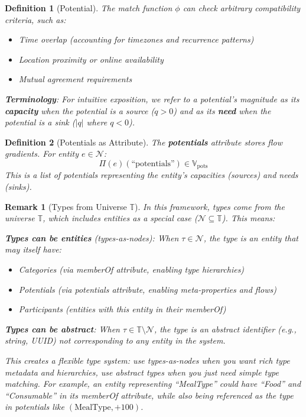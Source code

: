 \documentclass[11pt]{article}
\newtheorem{definition}{Definition}
\newtheorem{remark}{Remark}
\begin{document}
\begin{definition}[Potential]
The match function $\phi$ can check arbitrary compatibility criteria, such as:
\begin{itemize}
\item Time overlap (accounting for timezones and recurrence patterns)
\item Location proximity or online availability
\item Mutual agreement requirements
\end{itemize}

\textbf{Terminology}: For intuitive exposition, we refer to a potential's magnitude as its \textbf{capacity} when the potential is a source ($q > 0$) and as its \textbf{need} when the potential is a sink ($|q|$ where $q < 0$).
\end{definition}

\begin{definition}[Potentials as Attribute]
The \textbf{potentials} attribute stores flow gradients. For entity $e \in \mathcal{N}$:
\[
\Pi(e)(\text{``potentials''}) \in \mathbb{V}_{\text{pots}}
\]
This is a list of potentials representing the entity's capacities (sources) and needs (sinks).
\end{definition}

\begin{remark}[Types from Universe $\mathbb{T}$]
In this framework, types come from the universe $\mathbb{T}$, which includes entities as a special case ($\mathcal{N} \subseteq \mathbb{T}$). This means:

\textbf{Types can be entities} (types-as-nodes): When $\tau \in \mathcal{N}$, the type is an entity that may itself have:
\begin{itemize}
\item Categories (via memberOf attribute, enabling type hierarchies)
\item Potentials (via potentials attribute, enabling meta-properties and flows)
\item Participants (entities with this entity in their memberOf)
\end{itemize}

\textbf{Types can be abstract}: When $\tau \in \mathbb{T} \setminus \mathcal{N}$, the type is an abstract identifier (e.g., string, UUID) not corresponding to any entity in the system.

This creates a flexible type system: use types-as-nodes when you want rich type metadata and hierarchies, use abstract types when you just need simple type matching. For example, an entity representing ``MealType'' could have ``Food'' and ``Consumable'' in its memberOf attribute, while also being referenced as the type in potentials like $(\text{MealType}, +100)$.
\end{remark}
\end{document}

